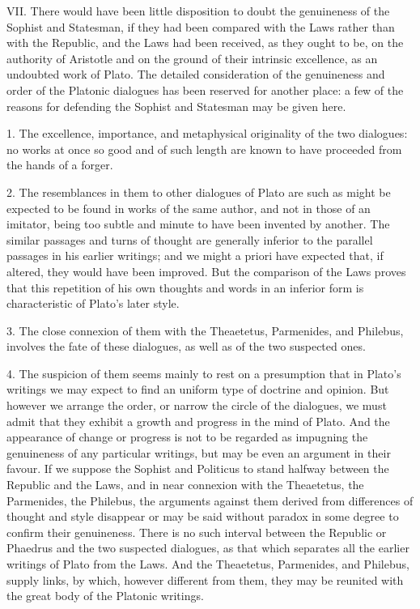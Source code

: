 \documentclass[11pt,letter]{article}
\begin{document}
\par  VII. There would have been little disposition to doubt the genuineness of the Sophist and Statesman, if they had been compared with the Laws rather than with the Republic, and the Laws had been received, as they ought to be, on the authority of Aristotle and on the ground of their intrinsic excellence, as an undoubted work of Plato. The detailed consideration of the genuineness and order of the Platonic dialogues has been reserved for another place: a few of the reasons for defending the Sophist and Statesman may be given here.

\par  1. The excellence, importance, and metaphysical originality of the two dialogues: no works at once so good and of such length are known to have proceeded from the hands of a forger.

\par  2. The resemblances in them to other dialogues of Plato are such as might be expected to be found in works of the same author, and not in those of an imitator, being too subtle and minute to have been invented by another. The similar passages and turns of thought are generally inferior to the parallel passages in his earlier writings; and we might a priori have expected that, if altered, they would have been improved. But the comparison of the Laws proves that this repetition of his own thoughts and words in an inferior form is characteristic of Plato's later style.

\par  3. The close connexion of them with the Theaetetus, Parmenides, and Philebus, involves the fate of these dialogues, as well as of the two suspected ones.

\par  4. The suspicion of them seems mainly to rest on a presumption that in Plato's writings we may expect to find an uniform type of doctrine and opinion. But however we arrange the order, or narrow the circle of the dialogues, we must admit that they exhibit a growth and progress in the mind of Plato. And the appearance of change or progress is not to be regarded as impugning the genuineness of any particular writings, but may be even an argument in their favour. If we suppose the Sophist and Politicus to stand halfway between the Republic and the Laws, and in near connexion with the Theaetetus, the Parmenides, the Philebus, the arguments against them derived from differences of thought and style disappear or may be said without paradox in some degree to confirm their genuineness. There is no such interval between the Republic or Phaedrus and the two suspected dialogues, as that which separates all the earlier writings of Plato from the Laws. And the Theaetetus, Parmenides, and Philebus, supply links, by which, however different from them, they may be reunited with the great body of the Platonic writings.
\end{document}
